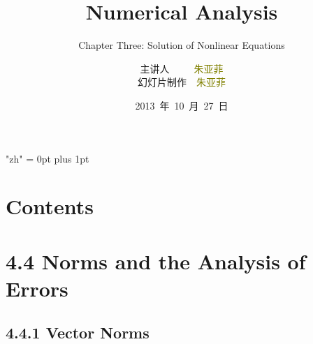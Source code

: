 \documentclass[notheorems,mathserif,table,compress]{beamer}  %
\begin{document}
\XeTeXlinebreaklocale "zh"         %
\XeTeXlinebreakskip = 0pt plus 1pt %


\title[Numerical Analysis]{Numerical Analysis}
\subtitle{Chapter Three: Solution of Nonlinear Equations}
\author[zhu]{主讲人~~~~~\textcolor{olive}{朱亚菲}\\
    \quad 幻灯片制作~~\textcolor{olive}{朱亚菲}}
\institute[中国海洋大学]{\small\textcolor{violet}{中国海洋大学~~信息科学与工程学院}}
\date{2013~年~10~月~27~日}
\frame{ \titlepage }
\section*{Contents}



\section{4.4 Norms and the Analysis of Errors}


\subsection{4.4.1 Vector Norms}
\end{document}
